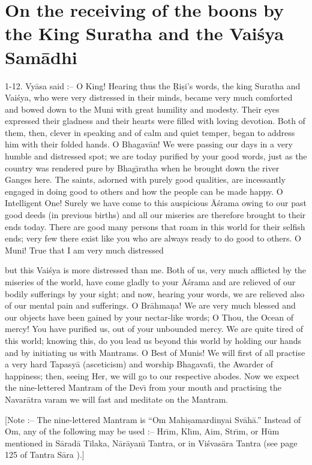 \chapter{On the receiving of the boons by the King Suratha and the Vai\'sya Sam\=adhi}

1-12. Vy\=asa said :-- O King! Hearing thus the \d{R}i\d{s}i's words, the king Suratha and Vai\'sya, who were very distressed in their minds, became very much comforted and bowed down to the Muni with great humility and modesty. Their eyes expressed their gladness and their hearts were filled with loving devotion. Both of them, then, clever in speaking and of calm and quiet temper, began to address him with their folded hands. O Bhagav\=an! We were passing our days in a very humble and distressed spot; we are today purified by your good words, just as the country was rendered pure by Bhag\={\i}ratha when he brought down the river Ganges here. The saints, adorned with purely good qualities, are incessantly engaged in doing good to others and how the people can be made happy. O Intelligent One! Surely we have come to this auspicious \=A\'srama owing to our past good deeds (in previous births) and all our miseries are therefore brought to their ends today. There are good many persons that roam in this world for their selfish ends; very few there exist like you who are always ready to do good to others. O Muni! True that I am very much distressed

but this Vai\'sya is more distressed than me. Both of us, very much afflicted by the miseries of the world, have come gladly to your \=A\'srama and are relieved of our bodily sufferings by your sight; and now, hearing your words, we are relieved also of our mental pain and sufferings. O Br\=ahma\d{n}a! We are very much blessed and our objects have been gained by your nectar-like words; O Thou, the Ocean of mercy! You have purified us, out of your unbounded mercy. We are quite tired of this world; knowing this, do you lead us beyond this world by holding our hands and by initiating us with Mantrams. O Best of Munis! We will first of all practise a very hard Tapasy\=a (asceticism) and worship Bhagavat\={\i}, the Awarder of happiness; then, seeing Her, we will go to our respective abodes. Now we expect the nine-lettered Mantram of the Dev\={\i} from your mouth and practising the Navar\=atra varam we will fast and meditate on the Mantram.

[Note :-- The nine-lettered Mantram is ``Om Mahi\d{s}amardinyai Sv\=ah\=a.'' Instead of Om, any of the following may be used :-- Hr\={\i}m, Kl\={\i}m, Aim, Str\={\i}m, or H\=um mentioned in S\=arad\=a Tilaka, N\=ar\=ayan\={\i} Tantra, or in Vi\'svas\=ara Tantra (see page 125 of Tantra S\=ara ).]

